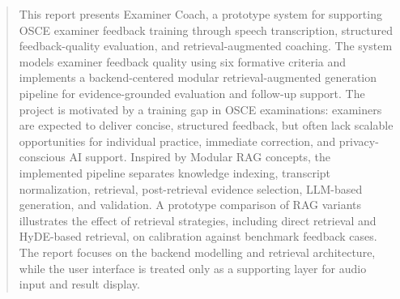 \begin{abstract}
\noindent
This report presents Examiner Coach, a prototype system for supporting OSCE
examiner feedback training through speech transcription, structured
feedback-quality evaluation, and retrieval-augmented coaching. The system
models examiner feedback quality using six formative criteria and implements a
backend-centered modular retrieval-augmented generation pipeline for
evidence-grounded evaluation and follow-up support. The project is motivated by
a training gap in OSCE examinations: examiners are expected to deliver concise,
structured feedback, but often lack scalable opportunities for individual
practice, immediate correction, and privacy-conscious AI support. Inspired by
Modular RAG concepts, the implemented pipeline separates knowledge indexing,
transcript normalization, retrieval, post-retrieval evidence selection,
LLM-based generation, and validation. A prototype comparison of RAG variants
illustrates the effect of retrieval strategies, including direct retrieval and
HyDE-based retrieval, on calibration against benchmark feedback cases. The
report focuses on the backend modelling and retrieval architecture, while the
user interface is treated only as a supporting layer for audio input and result
display.
\end{abstract}
